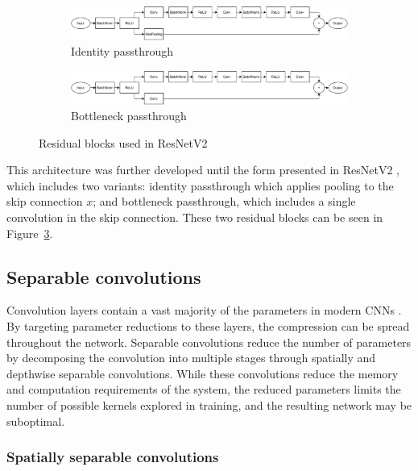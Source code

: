 \documentclass{article}
\begin{document}
	\begin{figure}[t!]
		\centering
		\begin{subfigure}[b]{\textwidth}
			\centering
			\includegraphics[width=\textwidth]{images/identity_base.pdf}
			\caption{Identity passthrough}
			\label{fig:resnet-identity}
		\end{subfigure}
		\vfill
		\begin{subfigure}[b]{\textwidth}
			\centering
			\includegraphics[width=\textwidth]{images/bottleneck_base.pdf}
			\caption{Bottleneck passthrough}
			\label{fig:resnet-bottleneck}
		\end{subfigure}
		\caption{Residual blocks used in ResNetV2}
		\label{fig:resnet}
	\end{figure}
	
	This architecture was further developed until the form presented in ResNetV2 \cite{resnetv2}, which includes two variants: identity passthrough which applies pooling to the skip connection $x$; and bottleneck passthrough, which includes a single convolution in the skip connection. These two residual blocks can be seen in Figure~\ref{fig:resnet}.
	
	\subsection{Separable convolutions}
	
	Convolution layers contain a vast majority of the parameters in modern CNNs \cite{inception,mobilenet,resnetv2}. By targeting parameter reductions to these layers, the compression can be spread throughout the network. Separable convolutions reduce the number of parameters by decomposing the convolution into multiple stages through spatially and depthwise separable convolutions. While these convolutions reduce the memory and computation requirements of the system, the reduced parameters limits the number of possible kernels explored in training, and the resulting network may be suboptimal.
	
	\subsubsection{Spatially separable convolutions}
	
\end{document}
